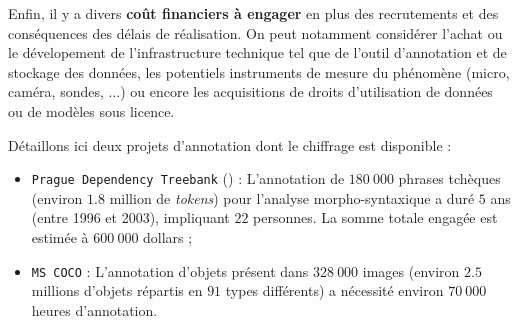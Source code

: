 			Enfin, il y a divers \textbf{coût financiers à engager} en plus des recrutements et des conséquences des délais de réalisation.
			On peut notamment considérer l'achat ou le dévelopement de l'infrastructure technique tel que de l'outil d'annotation et de stockage des données, les potentiels instruments de mesure du phénomène (micro, caméra, sondes, ...) ou encore les acquisitions de droits d'utilisation de données ou de modèles sous licence.
			
			\begin{leftBarExamples}
				Détaillons ici deux projets d'annotation dont le chiffrage est disponible :
				\begin{itemize}
					\item \texttt{Prague Dependency Treebank} (\cite{bohmova-etal:2003:prague-dependency-treebank}) :
					L'annotation de $180~000$ phrases tchèques (environ $1.8$ million de \textit{tokens}) pour l'analyse morpho-syntaxique a duré $5$ ans (entre 1996 et 2003), impliquant $22$ personnes.
					La somme totale engagée est estimée à $600~000$ dollars ;
					\item \texttt{MS COCO} \cite{lin-etal:2014:microsoft-coco-common} :
					L’annotation d'objets présent dans $328~000$ images (environ $2.5$ millions d'objets répartis en $91$ types différents) a nécessité environ $70~000$ heures d'annotation.
				\end{itemize}
			\end{leftBarExamples}
			
